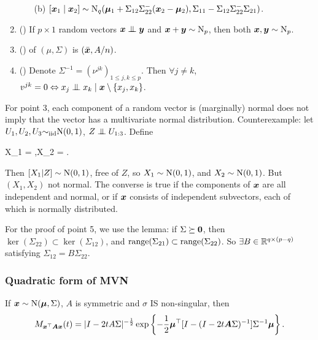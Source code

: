 \documentclass[10pt,a4paper]{book}
\begin{document}
\begin{thmbox}
\begin{theorem}
\begin{enumerate}
\begin{itemize}
				\item[(b)] $[{\boldsymbol x}_1\mid{\boldsymbol x}_2]\sim\mathrm{N}_q({\boldsymbol\mu}_1+{\Sigma}_{12}{\Sigma}_{22}^-({\boldsymbol x}_2-{\boldsymbol\mu}_2),\Sigma_{11}-\Sigma_{12}\Sigma_{22}^{-}\Sigma_{21})$. 
			\end{itemize}  
			\item () If $p\times 1$ random vectors $\x\indep \y$ and ${\boldsymbol x}+{\boldsymbol y}\sim\mathrm{N}_p$, then both ${\boldsymbol x},{\boldsymbol y}\sim\mathrm{N}_p$. 
			\item () of $(\mu,\Sigma)$ is $(\bar{{\boldsymbol x}},A/n)$.    
			\item () Denote $\Sigma^{-1}=(\nu^{jk})_{1\leq j,k\leq p}$. Then $\forall j\neq k$, $v^{jk}=0\Leftrightarrow  x_j\indep x_k \mid \x\setminus\{x_j,x_k\}$.    
		\end{enumerate} 
	\end{theorem}
\end{thmbox}
For point 3, each component of a random vector is (marginally) normal does not imply that the vector has a multivariate normal distribution. Counterexample: let $U_1,U_2,U_3{\sim}_{\mathrm{iid}}\mathrm{N}(0,1)$, $Z\indep U_{1:3}$. Define 
\begin{sequation*}
	X_1 = ,\quad X_2 = .
\end{sequation*}   
Then $[X_1|Z]\sim\mathrm{N}(0,1)$, free of $Z$, so $X_1\sim\mathrm{N}(0,1)$, and $X_2\sim\mathrm{N}(0,1)$. But $(X_1,X_2)$ not normal.
The converse is true if the components of ${\boldsymbol x}$ are all independent and normal, or if ${\boldsymbol x}$ consists of independent subvectors, each of which is normally distributed.

For the proof of point 5, we use the lemma: if $\Sigma\succeq {\boldsymbol 0}$, 
then $\ker(\Sigma_{22})\subset \ker(\Sigma_{12})$, and $\mathrm{range}(\Sigma_{21})\subset\mathrm{range}(\Sigma_{22})$. 
So $\exists B\in\mathbb R^{q\times(p-q)}$ satisfying $\Sigma_{12}=B\Sigma_{22}$.  

\subsubsection{Quadratic form of MVN}\label{sec:quad_MVN}
\begin{thmbox}
	\begin{proposition}[MGF]\label{prop:MVN_MGF_quad}
		If ${\boldsymbol x}\sim\mathrm{N}({\boldsymbol\mu},\Sigma)$, $A$ is symmetric and $\sigma$ IS non-singular, then 
		\begin{equation*}
			M_{{\boldsymbol x}^\top{\boldsymbol A}{\boldsymbol x}}(t)=|I-2tA\Sigma|^{-\frac{1}{2}}\exp\left\{ {-\frac{1}{2}{\boldsymbol\mu}^\top[I-(I-2t{\boldsymbol A}\Sigma)^{-1}]{\Sigma}^{-1}{\boldsymbol\mu}}\right\}.
		\end{equation*}
	\end{proposition}
\end{thmbox}
\end{document}
